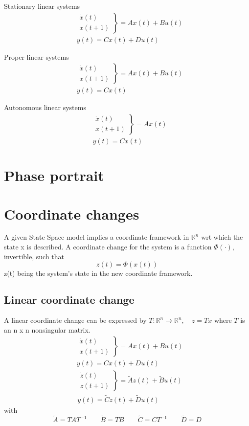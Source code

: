 \documentclass{book}
\newcommand{\R}{\mathbb{R}}
\theoremstyle{definition}
\theoremstyle{remark}
\theoremstyle{remark}
\begin{document}
Stationary linear systems
\begin{align*} 
&\left. \begin{array}{r} 
\dot{x}(t)\\[1ex]
{}x(t+1)
\end{array} \right\} 
=Ax(t)+Bu(t)\\
&y(t)=Cx(t) + Du(t)
\end{align*}

Proper linear systems
\begin{align*} 
&\left. \begin{array}{r} 
\dot{x}(t)\\[1ex]
{}x(t+1)
\end{array} \right\} 
=Ax(t)+Bu(t)\\
&y(t)=Cx(t)
\end{align*}

Autonomous linear systems
\begin{align*} 
&\left. \begin{array}{r} 
\dot{x}(t)\\[1ex]
{}x(t+1)
\end{array} \right\} 
=Ax(t)\\
&y(t)=Cx(t)
\end{align*}

\section{Phase portrait}

\section{Coordinate changes}
A given State Space model implies a coordinate framework in $\R^n$ wrt which the state x is described. A coordinate change for the system is a function $\Phi(\cdot)$, invertible, such that 
\[
z(t)=\Phi(x(t))
\]
z(t) being the system's state in the new coordinate framework.
\subsection{Linear coordinate change}
A linear coordinate change can be expressed by $T:\R^n \to \R^n, \quad z=Tx$ where $T$ is an n x n nonsingular matrix.
\begin{align*} 
&\left. \begin{array}{r} 
\dot{x}(t)\\[1ex]
{}x(t+1)
\end{array} \right\} 
=Ax(t)+Bu(t)\\
&y(t)=Cx(t)+Du(t)
\end{align*}
\begin{align*} 
&\left. \begin{array}{r} 
\dot{z}(t)\\[1ex]
{}z(t+1)
\end{array} \right\} 
=\tilde{A}z(t)+\tilde{B}u(t)\\
&y(t)=\tilde{C}z(t)+\tilde{D}u(t)
\end{align*}
with
\[
\tilde{A}=TAT^{-1} \qquad \tilde{B}=TB \qquad \tilde{C}=CT^{-1} \qquad \tilde{D}=D
\]
\end{document}
